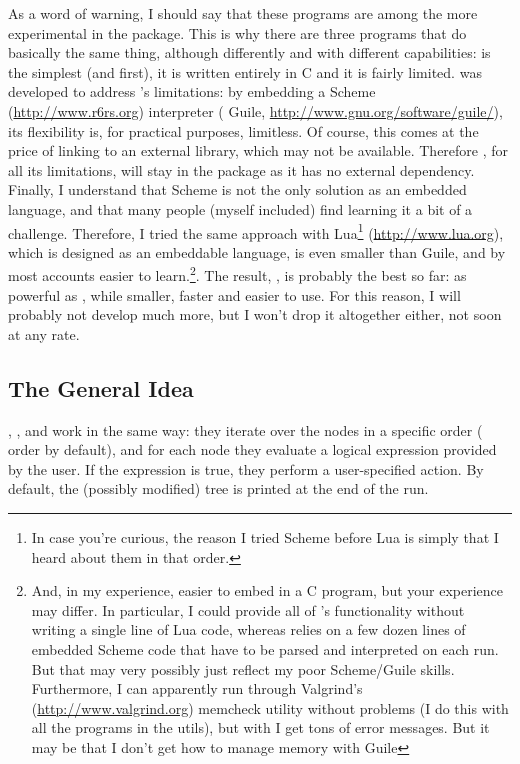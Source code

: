 As a word of warning, I should say that these programs are among the more
experimental in the \nutils{} package. This is why there are three programs
that do basically the same thing, although differently and with different
capabilities: \ed{} is the simplest (and first), it is written entirely in C
and it is fairly limited. \sched{} was developed to address \ed{}'s
limitations: by embedding a Scheme (\url{http://www.r6rs.org}) interpreter
(\gnu{} Guile, \url{http://www.gnu.org/software/guile/}), its flexibility is,
for practical purposes, limitless. Of course, this comes at the price of
linking to an external library, which may not be available. Therefore \ed{},
for all its limitations, will stay in the package as it has no external
dependency. Finally, I understand that Scheme is not the only solution as an
embedded language, and that many people (myself included) find learning it a
bit of a challenge.  Therefore, I tried the same approach with Lua\footnote{In
case you're curious, the reason I tried Scheme before Lua is simply that I
heard about them in that order.} (\url{http://www.lua.org}), which is designed
as an embeddable language, is even smaller than Guile, and by most accounts
easier to learn.\footnote{And, in my experience, easier to embed in a C
program, but your experience may differ. In particular, I could provide all of
\luaed's functionality without writing a single line of Lua code, whereas
\sched{} relies on a few dozen lines of embedded Scheme code that have to be
parsed and interpreted on each run. But that may very possibly just reflect my
poor Scheme/Guile skills. Furthermore, I can apparently run \luaed{} through
Valgrind's (\url{http://www.valgrind.org}) memcheck utility without problems (I
do this with all the programs in the utils), but with \sched{} I get tons of
error messages. But it may be that I don't get how to manage memory with
Guile}. The result, \luaed, is probably the best so far: as powerful as \sched,
while smaller, faster and easier to use. For this reason, I will probably not
develop \sched{} much more, but I won't drop it altogether either, not soon at
any rate. 

\subsection{The General Idea}

\ed, \sched, and \luaed{} work in the same way: they iterate over the nodes in a
specific order (\nw{} order by default), and for each node they evaluate a
logical expression provided by the user. If the expression is true, they perform
a user-specified action.  By default, the (possibly modified) tree is printed at
the end of the run.  

